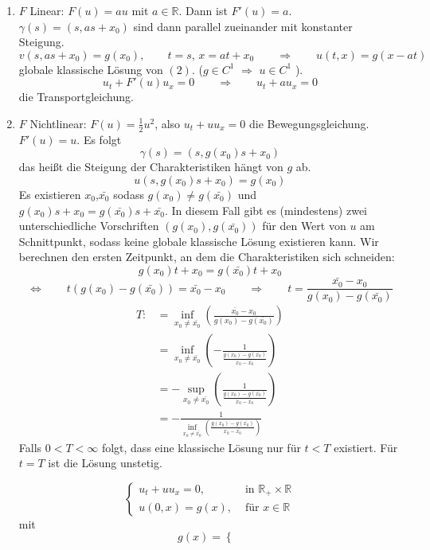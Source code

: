 \begin{enumerate}[1.)]
	\item $F$ Linear: $F(u) = au$ mit $a \in \mathbb{R}$. Dann ist $F'(u) = a$.
	$\gamma(s)=(s,as+x_0)$ sind dann parallel zueinander mit konstanter Steigung.
	\[
		v(s,as+x_0) = g(x_0), \qquad t=s, \, x=at+x_0 \qquad \Rightarrow \qquad u(t,x) = g(x-at)
	\]
	globale klassische Lösung von $(2)$. ($g \in C^1$ $\Rightarrow$ $u \in C^1$ ). \\
	\[
		u_t + F'(u) u_x =0 \qquad \Rightarrow \qquad u_t+ a u_x =0 
	\]
	die Transportgleichung.
	\item $F$ Nichtlinear: $F(u)= \frac{1}{2} u^2$, also $u_t + u u_x = 0$ die Bewegungsgleichung. $F'(u)=u$. Es folgt
	\[
		\gamma(s) = (s,g(x_0)s+x_0)
	\]
 	das heißt die Steigung der Charakteristiken hängt von $g$ ab.
	\[
		u(s,g(x_0)s+x_0) = g(x_0)
	\]
	Es existieren $x_0$,$\bar{x_0}$ sodass $g(x_0) \neq g(\bar{x_0})$ und $g(x_0)s+ x_0 = g(\bar{x_0})s + \bar{x_0}$. In diesem Fall gibt es (mindestens) zwei unterschiedliche Vorschriften $(g(x_0),g(\bar{x_0}))$ für den Wert von $u$ am Schnittpunkt, sodass keine globale klassische Lösung existieren kann. Wir berechnen den ersten Zeitpunkt, an dem die Charakteristiken sich schneiden:
	\[
		g(x_0)t + x_0 = g(\bar{x_0})t+ x_0
	\]
	\[
		\Leftrightarrow \qquad t(g(x_0)-g(\bar{x_0})) = \bar{x_0}-x_0 \qquad \Rightarrow \qquad t = \frac{\bar{x_0}-x_0}{g(x_0)-g(\bar{x_0})}
	\]
	\begin{align*}
		T:&= \inf_{x_0 \neq \bar{x_0}} \left( \frac{\bar{x_0}-x_0}{g(x_0)-g(\bar{x_0})} \right) \\
		&= \inf_{x_0 \neq \bar{x_0}} \left( - \frac{1}{\frac{g(x_0)- g(\bar{x_0})}{x_0-\bar{x_0}}} \right) \\
		& = - \sup_{x_0 \neq \bar{x_0}} \left( \frac{1}{\frac{g(x_0)-g(\bar{x_0})}{x_0-\bar{x_0}}} \right) \\
		&= - \frac{1}{\inf_{x_0 \neq \bar{x_0}}\left( \frac{g(x_0)-g(\bar{x_0})}{x_0-\bar{x_0}} \right)}
	\end{align*}
	Falls $0 < T < \infty$ folgt, dass eine klassische Lösung nur für $t < T$ existiert. Für $t=T$ ist die Lösung unstetig.
	\begin{beispiel}
		\[
			\begin{cases}
				u_t + uu_x = 0, &\text{ in }\mathbb{R}_+ \times \mathbb{R}\\
				u(0,x) = g(x), & \text{ für } x \in \mathbb{R}
			\end{cases}
		\]
		mit
		\[
			g(x) = \begin{cases}

\end{cases}\]
\end{beispiel}
\end{enumerate}
